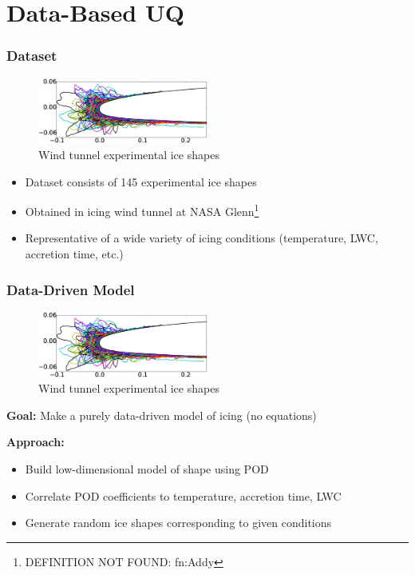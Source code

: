 \documentclass[9pt]{beamer}
\begin{document}
\section{Data-Based UQ}
\label{sec-3}
\begin{frame}
\frametitle{Dataset}
\label{sec-3-1}

\vspace*{-0.0cm}\begin{figure}
      \includegraphics[width=0.5\textwidth]{GlobalDataSet}
      \caption{Wind tunnel experimental ice shapes}
\end{figure}
\begin{itemize}
\item Dataset consists of 145 experimental ice shapes
\item Obtained in icing wind tunnel at NASA Glenn\footnote{DEFINITION NOT FOUND: fn:Addy }
\item Representative of a wide variety of icing conditions (temperature,
  LWC, accretion time, etc.)
\end{itemize}
  
\end{frame}
\begin{frame}
\frametitle{Data-Driven Model}
\label{sec-3-2}

\vspace*{-0.0cm}\begin{figure}
      \includegraphics[width=0.5\textwidth]{GlobalDataSet}
      \caption{Wind tunnel experimental ice shapes}
\end{figure}
\textbf{Goal:} Make a purely data-driven model of icing (no equations)

\textbf{Approach:}
\begin{itemize}
\item Build low-dimensional model of shape using POD
\item Correlate POD coefficients to temperature, accretion time, LWC
\item Generate random ice shapes corresponding to given conditions
\end{itemize}
\end{frame}
\end{document}
